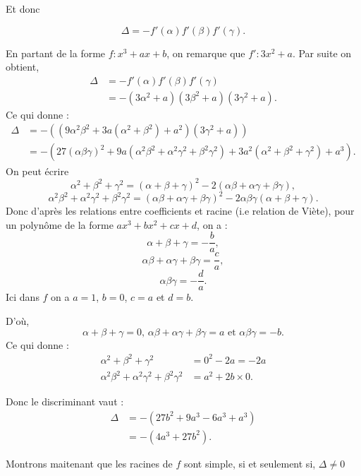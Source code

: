 \begin{demonstration}
Et donc 

\[
\Delta = - f'(\alpha) f'(\beta ) f'(\gamma)
.\] 

En partant de la forme $f : x^3 + ax + b$, on remarque que $f' : 3x^2 + a$. Par suite on obtient,
\begin{align*}
    \Delta &= - f'(\alpha) f'(\beta ) f'(\gamma) \\
      &= - \left( 3 \alpha^2 + a \right) \left( 3 \beta^2 + a \right) \left( 3 \gamma^2 + a \right) 
.\end{align*}
Ce qui donne :
\begin{align*}
    \Delta  &= - \left( ( 9 \alpha^2 \beta^2 + 3a ( \alpha^2 + \beta^2 ) + a^2 ) ( 3 \gamma^2 + a ) \right)  \\
       &= - \left( 27 \left( \alpha \beta \gamma \right)^2  + 9a \left( \alpha^2 \beta^2 + \alpha^2 \gamma^2 + \beta^2 \gamma^2 \right) + 3a^2 \left( \alpha^2 + \beta^2 + \gamma^2 \right) + a^3 \right) 
.\end{align*}
On peut écrire
\[
\alpha^2 + \beta^2 + \gamma^2 = \left( \alpha + \beta + \gamma \right)^2 - 2 \left( \alpha \beta + \alpha \gamma + \beta \gamma \right)
,\] 
\[
\alpha^2 \beta^2 + \alpha^2 \gamma^2 + \beta^2 \gamma^2 = \left( \alpha \beta + \alpha \gamma + \beta \gamma \right)^2 - 2\alpha \beta \gamma \left( \alpha + \beta + \gamma \right)
.\] 
Donc d'après les relations entre coefficients et racine (i.e relation de Viète), pour un polynôme de la forme $ax^3 + bx^2 + cx + d$, on a :
\[
\alpha + \beta + \gamma = - \frac{b}{a}
,\] 
\[
\alpha \beta + \alpha \gamma + \beta \gamma = \frac{c}{a}
,\] 
\[
\alpha \beta \gamma = - \frac{d}{a}
.\] 
Ici dans $f$ on a $a = 1$, $b = 0$, $c = a$ et $d = b$.

D'où,
\[
\alpha + \beta + \gamma = 0 \text{, } \alpha \beta + \alpha \gamma + \beta \gamma = a \text{ et } \alpha \beta \gamma = - b
.\] 
Ce qui donne : 
\begin{align*}
    \alpha^2 + \beta^2 + \gamma^2 &= 0^2 - 2a = -2a \\
    \alpha^2 \beta^2 + \alpha^2 \gamma^2 + \beta^2 \gamma^2 &= a^2 + 2b \times 0
.\end{align*}

Donc le discriminant vaut :
\begin{align*}
    \Delta &= - \left( 27b^2 + 9a^3 - 6a^3 + a^3  \right) \\
        &= - \left( 4a^3 + 27b^2  \right)
.\end{align*}

Montrons maitenant que les racines de $f$ sont simple, si et seulement si, $\Delta \neq 0$


\end{demonstration}

